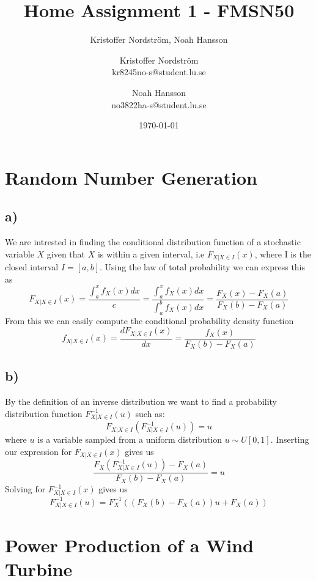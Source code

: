 \documentclass[a4paper]{article}
\title{Home Assignment 1 - FMSN50}
\author{Kristoffer Nordström, Noah Hansson}\author{Kristoffer Nordström \\ kr8245no-s@student.lu.se \and  Noah Hansson \\ no3822ha-s@student.lu.se}
\date{\today}
\begin{document}
\maketitle
\newpage

 
\section{Random Number Generation}\label{sec:RNG}
\subsection*{a)}
We are intrested in finding the conditional distribution function of a stochastic variable $X$ given that $X$ is within a given interval, i.e $F_{X|X\in I}(x)$, where I is the closed interval $I = [a,b]$. Using the law of total probability we can express this as
\begin{equation}
    F_{X|X\in{I}}(x) = \frac{\int_a^xf_X(x)dx}{c} = \frac{\int_a^xf_X(x)dx}{\int_a^bf_X(x)dx} = \frac{F_X(x)-F_X(a)}{F_X(b)-F_X(a)}
\end{equation}
From this we can easily compute the conditional probability density function
\begin{equation}
    f_{X|X\in{I}}(x) = \frac{dF_{X|X\in{I}}(x)}{dx} = \frac{f_X(x)}{F_X(b)-F_X(a)}
\end{equation}

\subsection*{b)}
By the definition of an inverse distribution we want to find a probability distribution function $F_{X|X \in I}^{-1}(u)$ such as:
\begin{equation}
    F_{X|X \in I}(F_{X|X \in I}^{-1}(u)) = u
\end{equation}
where $u$ is a variable sampled from a uniform distribution $u \sim U[0,1]$. Inserting our expression for $F_{X|X \in I}(x)$ gives us
\begin{equation}
    \frac{F_X(F_{X|X\in I}^{-1}(u))-F_X(a)}{F_X(b)-F_X(a)} = u
\end{equation}
Solving for $F_{X|X\in I}^{-1}(x)$ gives us
\begin{equation}
    F_{X|X\in I}^{-1}(u) = F_X^{-1}((F_X(b)-F_X(a))u + F_X(a))
\end{equation}


\newpage
\section{Power Production of a Wind Turbine}
\label{sec:oneTurbine}
\end{document}
